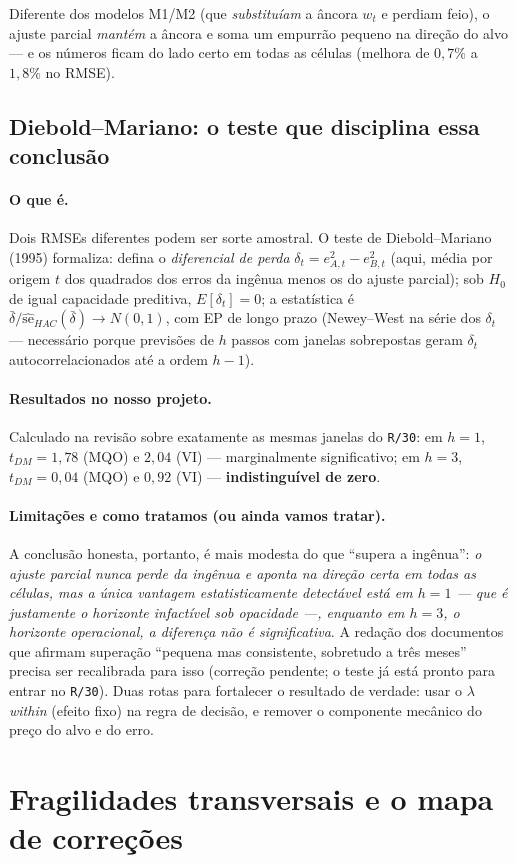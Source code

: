 \documentclass[11pt,a4paper]{article}
\newcommand{\oquee}[0]{\paragraph{O que é.}}
\newcommand{\resultados}[0]{\paragraph{Resultados no nosso projeto.}}
\newcommand{\limitacoes}[0]{\paragraph{Limitações e como tratamos (ou ainda vamos tratar).}}
\begin{document}
Diferente dos modelos M1/M2 (que \emph{substituíam} a âncora $w_t$ e perdiam feio), o ajuste
parcial \emph{mantém} a âncora e soma um empurrão pequeno na direção do alvo --- e os números
ficam do lado certo em todas as células (melhora de $0{,}7\%$ a $1{,}8\%$ no RMSE).

\subsection{Diebold--Mariano: o teste que disciplina essa conclusão}

\oquee Dois RMSEs diferentes podem ser sorte amostral. O teste de Diebold--Mariano (1995)
formaliza: defina o \emph{diferencial de perda} $\delta_t = e^2_{A,t} - e^2_{B,t}$ (aqui, média
por origem $t$ dos quadrados dos erros da ingênua menos os do ajuste parcial); sob $H_0$ de igual
capacidade preditiva, $E[\delta_t]=0$; a estatística é $\bar\delta/\widehat{\mathrm{se}}_{HAC}(\bar\delta)
\to N(0,1)$, com EP de longo prazo (Newey--West na série dos $\delta_t$ --- necessário porque
previsões de $h$ passos com janelas sobrepostas geram $\delta_t$ autocorrelacionados até a ordem
$h-1$).

\resultados Calculado na revisão sobre exatamente as mesmas janelas do \texttt{R/30}: em $h=1$,
$t_{DM}=1{,}78$ (MQO) e $2{,}04$ (VI) --- marginalmente significativo; em $h=3$, $t_{DM}=0{,}04$
(MQO) e $0{,}92$ (VI) --- \textbf{indistinguível de zero}.

\limitacoes A conclusão honesta, portanto, é mais modesta do que ``supera a ingênua'': \emph{o
ajuste parcial nunca perde da ingênua e aponta na direção certa em todas as células, mas a única
vantagem estatisticamente detectável está em $h=1$ --- que é justamente o horizonte infactível sob
opacidade ---, enquanto em $h=3$, o horizonte operacional, a diferença não é significativa}. A
redação dos documentos que afirmam superação ``pequena mas consistente, sobretudo a três meses''
precisa ser recalibrada para isso (correção pendente; o teste já está pronto para entrar no
\texttt{R/30}). Duas rotas para fortalecer o resultado de verdade: usar o $\lambda$ \emph{within}
(efeito fixo) na regra de decisão, e remover o componente mecânico do preço do alvo e do erro.

\section{Fragilidades transversais e o mapa de correções}
\label{sec:winsor}
\end{document}
